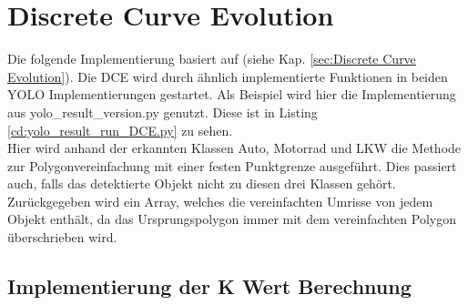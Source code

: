 \section{Discrete Curve Evolution}{
	\label{py:DCE}
	Die folgende Implementierung basiert auf \citeauthor{Barkowsky2000} \citep{Barkowsky2000} (siehe Kap. \ref{sec:Discrete Curve Evolution}). Die DCE wird durch ähnlich implementierte Funktionen in beiden YOLO Implementierungen gestartet. Als Beispiel wird hier die Implementierung aus yolo\_result\_version.py genutzt. Diese ist in Listing \ref{cd:yolo_result_run_DCE.py} zu sehen. \\

	
	Hier wird anhand der erkannten Klassen Auto, Motorrad und LKW die Methode zur Polygonvereinfachung mit einer festen Punktgrenze ausgeführt. Dies passiert auch, falls das detektierte Objekt nicht zu diesen drei Klassen gehört. \\ 
	Zurückgegeben wird ein Array, welches die vereinfachten Umrisse von jedem Objekt enthält, da das Ursprungspolygon immer mit dem vereinfachten Polygon überschrieben wird. \\

	\subsection{Implementierung der K Wert Berechnung \label{impl:Calc_K_Val}} 

}
